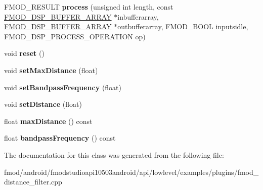 \begin{DoxyCompactItemize}
\item 
\hypertarget{class_f_m_o_d_distance_filter_state_a03823ae50036742968747452fcb5a647}{F\+M\+O\+D\+\_\+\+R\+E\+S\+U\+L\+T {\bfseries process} (unsigned int length, const \hyperlink{struct_f_m_o_d___d_s_p___b_u_f_f_e_r___a_r_r_a_y}{F\+M\+O\+D\+\_\+\+D\+S\+P\+\_\+\+B\+U\+F\+F\+E\+R\+\_\+\+A\+R\+R\+A\+Y} $\ast$inbufferarray, \hyperlink{struct_f_m_o_d___d_s_p___b_u_f_f_e_r___a_r_r_a_y}{F\+M\+O\+D\+\_\+\+D\+S\+P\+\_\+\+B\+U\+F\+F\+E\+R\+\_\+\+A\+R\+R\+A\+Y} $\ast$outbufferarray, F\+M\+O\+D\+\_\+\+B\+O\+O\+L inputsidle, F\+M\+O\+D\+\_\+\+D\+S\+P\+\_\+\+P\+R\+O\+C\+E\+S\+S\+\_\+\+O\+P\+E\+R\+A\+T\+I\+O\+N op)}\label{class_f_m_o_d_distance_filter_state_a03823ae50036742968747452fcb5a647}

\item 
\hypertarget{class_f_m_o_d_distance_filter_state_a1245b63fe25cff3a01947cef2607c458}{void {\bfseries reset} ()}\label{class_f_m_o_d_distance_filter_state_a1245b63fe25cff3a01947cef2607c458}

\item 
\hypertarget{class_f_m_o_d_distance_filter_state_a6f92af6db08e816364e396b277c37adf}{void {\bfseries set\+Max\+Distance} (float)}\label{class_f_m_o_d_distance_filter_state_a6f92af6db08e816364e396b277c37adf}

\item 
\hypertarget{class_f_m_o_d_distance_filter_state_a6073b56f7406954dce87185d41fbf0e6}{void {\bfseries set\+Bandpass\+Frequency} (float)}\label{class_f_m_o_d_distance_filter_state_a6073b56f7406954dce87185d41fbf0e6}

\item 
\hypertarget{class_f_m_o_d_distance_filter_state_a80372dcee050d2ce810c3494180e8070}{void {\bfseries set\+Distance} (float)}\label{class_f_m_o_d_distance_filter_state_a80372dcee050d2ce810c3494180e8070}

\item 
\hypertarget{class_f_m_o_d_distance_filter_state_ab5d10610be49d56a2ba1df4c74186e3f}{float {\bfseries max\+Distance} () const }\label{class_f_m_o_d_distance_filter_state_ab5d10610be49d56a2ba1df4c74186e3f}

\item 
\hypertarget{class_f_m_o_d_distance_filter_state_a2705c2f8e2f3594e2e5c31c8e20cdc6d}{float {\bfseries bandpass\+Frequency} () const }\label{class_f_m_o_d_distance_filter_state_a2705c2f8e2f3594e2e5c31c8e20cdc6d}

\end{DoxyCompactItemize}


The documentation for this class was generated from the following file\+:\begin{DoxyCompactItemize}
\item 
fmod/android/fmodstudioapi10503android/api/lowlevel/examples/plugins/fmod\+\_\+distance\+\_\+filter.\+cpp\end{DoxyCompactItemize}
